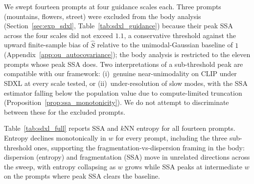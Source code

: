 \documentclass{article}
\begin{document}
We swept fourteen prompts at four guidance scales each. Three
prompts (mountains, flowers, street) were excluded from the body
analysis (Section~\ref{sec:exp_sdxl}, Table~\ref{tab:sdxl_guidance})
because their peak SSA across the four scales did not exceed $1.1$,
a conservative threshold against the upward finite-sample bias of
$\hat S$ relative to the unimodal-Gaussian baseline of $1$
(Appendix~\ref{app:ou_autocovariance}); the body analysis is
restricted to the eleven prompts whose peak SSA does. Two
interpretations of a sub-threshold peak are compatible with our
framework: (i)~genuine near-unimodality on CLIP under SDXL at every
scale tested, or (ii)~under-resolution of slow modes, with the SSA
estimator falling below the population value due to compute-limited
truncation (Proposition~\ref{prop:ssa_monotonicity}). We do not
attempt to discriminate between these for the excluded prompts.

Table~\ref{tab:sdxl_full} reports SSA and $k$NN entropy for all
fourteen prompts. Entropy declines monotonically in $w$ for every
prompt, including the three sub-threshold ones, supporting the
fragmentation-vs-dispersion framing in the body: dispersion (entropy)
and fragmentation (SSA) move in unrelated directions across the
sweep, with entropy collapsing as $w$ grows while SSA peaks at
intermediate $w$ on the prompts where peak SSA clears the baseline.
\end{document}
